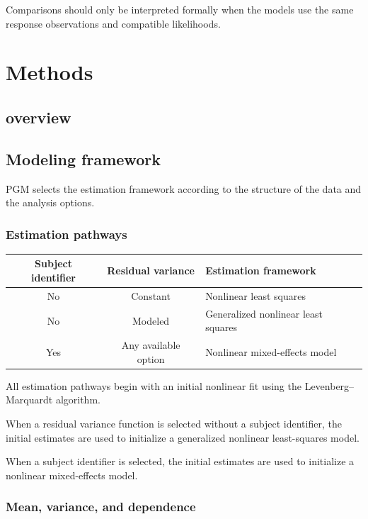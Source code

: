 \documentclass[
  english,
  letterpaper,
  DIV=11,
  numbers=noendperiod]{scrreprt}
\newcounter{none} %
\begin{document}
Comparisons should only be interpreted formally when the models use the
same response observations and compatible likelihoods.

\part{Methods}

\chapter{overview}\label{overview}

\chapter{Modeling framework}\label{modeling-framework}

PGM selects the estimation framework according to the structure of the
data and the analysis options.

\section{Estimation pathways}\label{estimation-pathways}

{\def\LTcaptype{none} %
\begin{longtable}[]{@{}ccl@{}}
\toprule\noalign{}
Subject identifier & Residual variance & Estimation framework \\
\midrule\noalign{}
\endhead
\bottomrule\noalign{}
\endlastfoot
No & Constant & Nonlinear least squares \\
No & Modeled & Generalized nonlinear least squares \\
Yes & Any available option & Nonlinear mixed-effects model \\
\end{longtable}
}

All estimation pathways begin with an initial nonlinear fit using the
Levenberg--Marquardt algorithm.

When a residual variance function is selected without a subject
identifier, the initial estimates are used to initialize a generalized
nonlinear least-squares model.

When a subject identifier is selected, the initial estimates are used to
initialize a nonlinear mixed-effects model.

\section{Mean, variance, and
dependence}\label{mean-variance-and-dependence}
\end{document}

